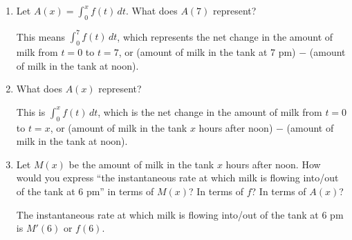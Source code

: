\documentclass[main]{subfiles}
\begin{document}
\begin{enumerate}[resume]
\begin{enumerate}
    \begin{problem}[\vfill]
      How much milk is in the tank $x$ hours after noon?
    \end{problem}

    \begin{solution}
      $\displaystyle 15,000 + \int_0^x f(t)\,dt$. 
    \end{solution}

  \item
    \begin{problem}[\vfill]
        Let $A(x) = \displaystyle\int_0^x f(t) \, dt$.  What does $A(7)$ represent?
    \end{problem}

    \begin{solution}
      This means $\displaystyle \int_0^7 f(t)\,dt$, which represents
      the net change in the amount of milk from $t=0$ to $t=7$, or
      (amount of milk in the tank at 7 pm) $-$ (amount of milk in the tank
      at noon).
    \end{solution}

  \item
    \begin{problem}[\vfill]
      What does $A(x)$ represent?
    \end{problem}

    \begin{solution}
      This is $\displaystyle \int_0^x f(t)\,dt$, which is the
      net change in the amount of milk from $t=0$ to $t=x$, or
      (amount of milk in the tank $x$ hours after noon) $-$ (amount of
      milk in the tank at noon).
    \end{solution}

  \item


    \begin{problem}[\vfill\newpage]
      Let $M(x)$ be the amount of milk in the tank $x$ hours after noon.
      How would you express ``the instantaneous rate at which milk is
      flowing into/out of the tank at 6 pm'' in terms of $M(x)$?  In terms of
      $f$?  In terms of $A(x)$?
    \end{problem}

    \begin{solution}
      The instantaneous rate at which milk is flowing into/out of the tank
      at 6 pm is $M'(6)$ or $f(6)$.


\end{solution}
\end{enumerate}
\end{enumerate}
\end{document}
